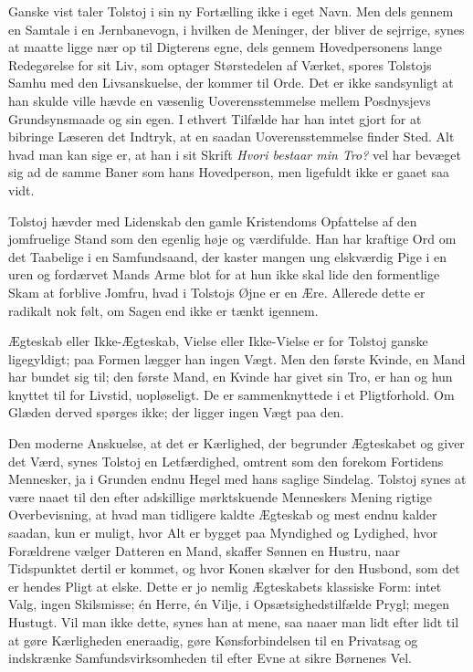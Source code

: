 \documentclass[12pt,a4paper]{article}
\begin{document}
Ganske vist taler Tolstoj i sin ny Fortælling ikke i eget Navn. Men dels
gennem en Samtale i en Jernbanevogn, i hvilken de Meninger, der bliver de
sejrrige, synes at maatte ligge nær op til Digterens egne, dels gennem
Hovedpersonens lange Redegørelse for sit Liv, som optager Størstedelen af
Værket, spores Tolstojs Samhu med den Livsanskuelse, der kommer til Orde.
Det er ikke sandsynligt at han skulde ville hævde en væsenlig
Uoverensstemmelse mellem Posdnysjevs Grundsynsmaade og sin egen. I ethvert
Tilfælde har han intet gjort for at bibringe Læseren det Indtryk, at en
saadan Uoverensstemmelse finder Sted. Alt hvad man kan sige er, at han i
sit Skrift \textit{Hvori bestaar min Tro?} vel har bevæget sig ad de samme
Baner som hans Hovedperson, men ligefuldt ikke er gaaet saa vidt.

Tolstoj hævder med Lidenskab den gamle Kristendoms Opfattelse af den
jomfruelige Stand som den egenlig høje og værdifulde. Han har kraftige Ord
om det Taabelige i en Samfundsaand, der kaster mangen ung elskværdig Pige
i en uren og fordærvet Mands Arme blot for at hun ikke skal lide den
formentlige Skam at forblive Jomfru, hvad i Tolstojs Øjne er en Ære.
Allerede dette er radikalt nok følt, om Sagen end ikke er tænkt igennem.

Ægteskab eller Ikke-Ægteskab, Vielse eller Ikke-Vielse er for Tolstoj
ganske ligegyldigt; paa Formen lægger han ingen Vægt. Men den første
Kvinde, en Mand har bundet sig til; den første Mand, en Kvinde har givet
sin Tro, er han og hun knyttet til for Livstid, uopløseligt. De er
sammenknyttede i et Pligtforhold. Om Glæden derved spørges ikke; der
ligger ingen Vægt paa den.

Den moderne Anskuelse, at det er Kærlighed, der begrunder Ægteskabet og
giver det Værd, synes Tolstoj en Letfærdighed, omtrent som den forekom
Fortidens Mennesker, ja i Grunden endnu Hegel med hans saglige Sindelag.
Tolstoj synes at være naaet til den efter adskillige mørktskuende
Menneskers Mening rigtige Overbevisning, at hvad man tidligere kaldte
Ægteskab og mest endnu kalder saadan, kun er muligt, hvor Alt er bygget
paa Myndighed og Lydighed, hvor Forældrene vælger Datteren en Mand,
skaffer Sønnen en Hustru, naar Tidspunktet dertil er kommet, og hvor
Konen skælver for den Husbond, som det er hendes Pligt at elske. Dette er
jo nemlig Ægteskabets klassiske Form: intet Valg, ingen Skilsmisse; én
Herre, én Vilje, i Opsætsighedstilfælde Prygl; megen Hustugt. Vil man
ikke dette, synes han at mene, saa naaer man lidt efter lidt til at gøre
Kærligheden eneraadig, gøre Kønsforbindelsen til en Privatsag og
indskrænke Samfundsvirksomheden til efter Evne at sikre Børnenes Vel.
\end{document}
